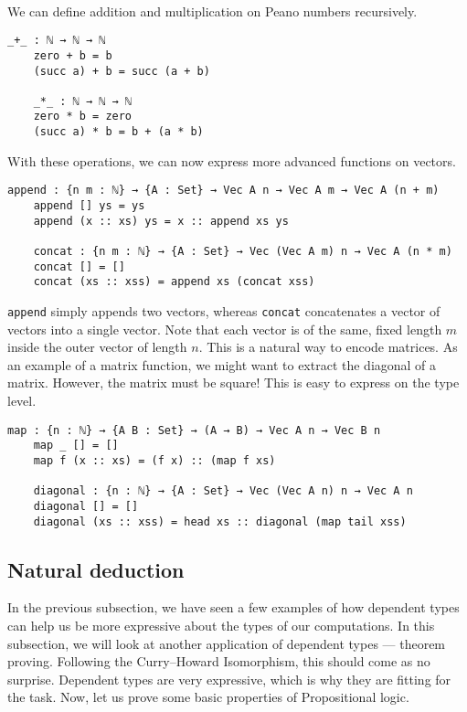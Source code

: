 \documentclass[12pt]{article}
\begin{document}
\paragraph{}
We can define addition and multiplication on Peano numbers recursively.
\begin{Verbatim}[samepage=true]
    _+_ : ℕ → ℕ → ℕ
    zero + b = b
    (succ a) + b = succ (a + b)

    _*_ : ℕ → ℕ → ℕ
    zero * b = zero
    (succ a) * b = b + (a * b)
\end{Verbatim}
With these operations, we can now express more advanced functions on vectors.
\begin{Verbatim}[samepage=true]
    append : {n m : ℕ} → {A : Set} → Vec A n → Vec A m → Vec A (n + m)
    append [] ys = ys
    append (x :: xs) ys = x :: append xs ys

    concat : {n m : ℕ} → {A : Set} → Vec (Vec A m) n → Vec A (n * m)
    concat [] = []
    concat (xs :: xss) = append xs (concat xss)
\end{Verbatim}
\verb|append| simply appends two vectors, whereas \verb|concat| concatenates a vector of vectors into a single vector. Note that each vector is of the same, fixed length $m$ inside the outer vector of length $n$. This is a natural way to encode matrices. As an example of a matrix function, we might want to extract the diagonal of a matrix. However, the matrix must be square! This is easy to express on the type level.
\begin{Verbatim}[samepage=true]
    map : {n : ℕ} → {A B : Set} → (A → B) → Vec A n → Vec B n
    map _ [] = []
    map f (x :: xs) = (f x) :: (map f xs)

    diagonal : {n : ℕ} → {A : Set} → Vec (Vec A n) n → Vec A n
    diagonal [] = []
    diagonal (xs :: xss) = head xs :: diagonal (map tail xss)
\end{Verbatim}

\subsection{Natural deduction}
In the previous subsection, we have seen a few examples of how dependent types can help us be more expressive about the types of our computations. In this subsection, we will look at another application of dependent types — theorem proving. Following the Curry–Howard Isomorphism, this should come as no surprise. Dependent types are very expressive, which is why they are fitting for the task. Now, let us prove some basic properties of Propositional logic.
\end{document}
